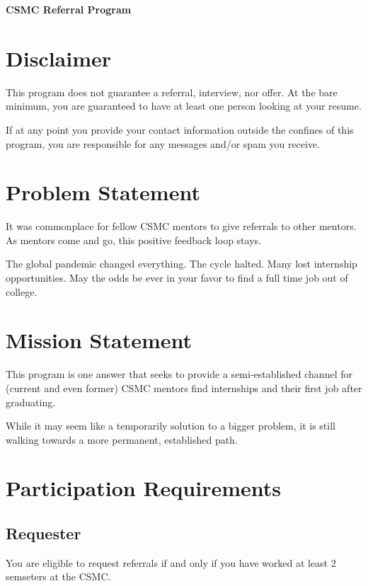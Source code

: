 \documentclass[letterpaper, 12pt]{article}
\newcommand{\minSemesters}{2}
\begin{document}
\begin{center}
    \bfseries\Large CSMC Referral Program
\end{center}

\section{Disclaimer}\label{section:disclaimer}

This program does not guarantee a referral, interview, nor offer. At the
bare minimum, you are guaranteed to have at least one person looking at your
resume.

If at any point you provide your contact information outside the confines of
this program, you are responsible for any messages and/or spam you
receive.\label{section:disclaimer:spamMessages}

\section{Problem Statement}

It was commonplace for fellow CSMC mentors to give referrals to other mentors.
As mentors come and go, this positive feedback loop stays.

The global pandemic changed everything. The cycle halted. Many lost internship
opportunities. May the odds be ever in your favor to find a full time job out of
college.

\section{Mission Statement}

This program is one answer that seeks to provide a semi-established channel for
(current and even former) CSMC mentors find internships and their first job after
graduating.

While it may seem like a temporarily solution to a bigger problem, it is still
walking towards a more permanent, established path.

\section{Participation Requirements}

\subsection{Requester}

You are eligible to request referrals if and only if you have worked at least
\minSemesters{} semseters at the CSMC.
\end{document}
